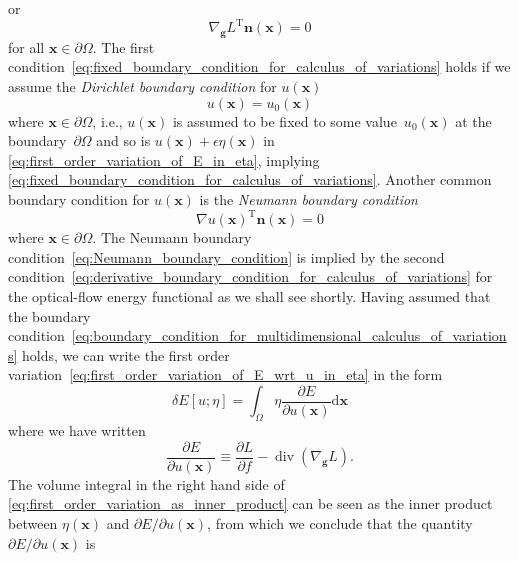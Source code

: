 \documentclass[12pt,a4paper]{article}
\begin{document}
or
\begin{equation}
{\nabla_{\mathbf{g}} L}^{\operatorname{T}} \mathbf{n}(\mathbf{x}) = 0
\label{eq:derivative_boundary_condition_for_calculus_of_variations}
\end{equation}
for all $\mathbf{x} \in \partial\Omega$.
The first condition~\eqref{eq:fixed_boundary_condition_for_calculus_of_variations} holds
if we assume the \emph{Dirichlet boundary condition} for $u(\mathbf{x})$
\begin{equation}
u(\mathbf{x}) = u_0(\mathbf{x})
\label{eq:Dirichlet_boundary_condition}
\end{equation}
where $\mathbf{x} \in \partial\Omega$, i.e.,
$u(\mathbf{x})$ is assumed to be fixed to some value~$u_0(\mathbf{x})$
at the boundary~$\partial\Omega$ and
so is $u(\mathbf{x}) + \epsilon\eta(\mathbf{x})$ in
\eqref{eq:first_order_variation_of_E_in_eta},
implying \eqref{eq:fixed_boundary_condition_for_calculus_of_variations}.
Another common boundary condition for $u(\mathbf{x})$ is the \emph{Neumann boundary condition}
\begin{equation}
{\nabla u(\mathbf{x})}^{\operatorname{T}} \mathbf{n}(\mathbf{x}) = 0
\label{eq:Neumann_boundary_condition}
\end{equation}
where $\mathbf{x} \in \partial\Omega$.
The Neumann boundary condition~\eqref{eq:Neumann_boundary_condition} is implied by
the second condition~\eqref{eq:derivative_boundary_condition_for_calculus_of_variations}
for the optical-flow energy functional as we shall see shortly.
Having assumed that
the boundary condition~\eqref{eq:boundary_condition_for_multidimensional_calculus_of_variations}
holds, we can write the first order variation~\eqref{eq:first_order_variation_of_E_wrt_u_in_eta}
in the form
\begin{equation}
\delta E[u; \eta] = \int_{\Omega} \eta \frac{\partial E}{\partial u(\mathbf{x})}
\mathrm{d}\mathbf{x}
\label{eq:first_order_variation_as_inner_product}
\end{equation}
where we have written
\begin{equation}
\frac{\partial E}{\partial u(\mathbf{x})} \equiv
\frac{\partial L}{ \partial f} - \operatorname{div}\left( \nabla_{\mathbf{g}} L \right) .
\label{eq:multidimensional_functional_derivative}
\end{equation}
The volume integral in the right hand side of
\eqref{eq:first_order_variation_as_inner_product} can be seen as the inner product between
$\eta(\mathbf{x})$ and $\partial E/\partial u(\mathbf{x})$,
from which we conclude that the quantity~$\partial E/\partial u(\mathbf{x})$ is
\end{document}
